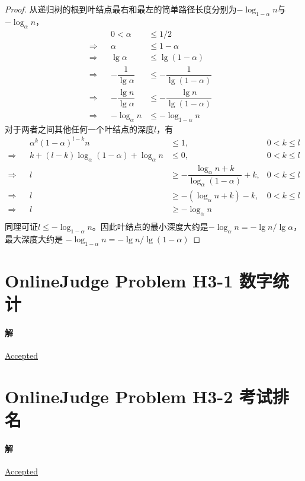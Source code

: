 \documentclass{article}
\begin{document}
\begin{proof}
从递归树的根到叶结点最右和最左的简单路径长度分别为$-\log_{1 - \alpha}{n}$与$-\log_{\alpha}{n}$，
\begin{align*}
    && 0 < \alpha &\leq 1/2 & \\
    \Rightarrow && \alpha &\leq  1 - \alpha & \\
    \Rightarrow && \lg{\alpha} &\leq \lg{(1 - \alpha)} & \\
    \Rightarrow && -\dfrac{1}{\lg{\alpha}} &\leq -\dfrac{1}{\lg{(1 - \alpha)}} & \\
    \Rightarrow && -\dfrac{\lg{n}}{\lg{\alpha}} &\leq -\dfrac{\lg{n}}{\lg{(1 - \alpha)}} & \\
    \Rightarrow && -\log_{\alpha}{n} &\leq -\log_{1 - \alpha}{n} &
\end{align*}
对于两者之间其他任何一个叶结点的深度$l$，有
\begin{align*}
    && \alpha^k(1 - \alpha)^{l-k}n &\leq 1 ,& 0 < k \leq l \\
    \Rightarrow && k + (l-k)\log_{\alpha}{(1 - \alpha)} + \log_{\alpha}{n} &\leq 0 ,& 0 < k \leq l \\
    \Rightarrow && l &\geq -\dfrac{\log_{\alpha}{n} + k}{\log_{\alpha}{(1 - \alpha)}}+k ,& 0 < k \leq l \\
    \Rightarrow && l &\geq -(\log_{\alpha}{n} + k) - k ,& 0 < k \leq l \\
    \Rightarrow && l &\geq -\log_{\alpha}{n} & \\
\end{align*}
同理可证$l \leq -\log_{1 - \alpha}{n}$。因此叶结点的最小深度大约是$-\log_{\alpha}{n} = −\lg{n}/\lg{\alpha}$，最大深度大约是 $-\log_{1 - \alpha}{n} = −\lg{n}/\lg{(1−\alpha)}$
\end{proof}

\section{OnlineJudge Problem H3-1 数字统计}

\paragraph{解}
\href{https://202.38.86.171/status/ce8c27ff6b1ffab6e9fb4db6dd770a60}{\underline{Accepted}}
\\

\section{OnlineJudge Problem H3-2 考试排名}

\paragraph{解}
\href{https://202.38.86.171/status/c68c59682ab2efe4a7fd628089e117c7}{\underline{Accepted}}
\\
\end{document}
